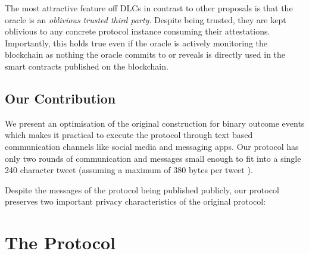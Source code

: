 \documentclass[runningheads]{llncs}
\begin{document}
The most attractive feature off DLCs in contrast to other proposals is that the oracle is an \emph{oblivious trusted third party}\cite{cryptoeprint:2011:319}. Despite being trusted, they are kept oblivious to any concrete protocol instance consuming their attestations. Importantly, this holds true even if the oracle is actively monitoring the blockchain as nothing the oracle commits to or reveals is directly used in the smart contracts published on the blockchain.

\subsection{Our Contribution}

We present an optimisation of the original construction for binary outcome events which makes it practical to execute the protocol through text based communication channels like social media and messaging apps. Our protocol has only two rounds of communication and messages small enough to fit into a single 240 character tweet (assuming a maximum of 380 bytes per tweet \cite{base2048}).

Despite the messages of the protocol being published publicly, our protocol preserves two important privacy characteristics of the original protocol:




\section{The Protocol}
\newcommand{\Rec}{\textsf{Rec}}
\newcommand{\bet}{\beta}
\newcommand{\hatsigma}{\hat{\sigma}}
\newcommand{\Fund}{\textsf{Fund}}
\newcommand{\Outcome}{\textsf{Outcome}}
\newcommand{\KeyGen}{\textsf{KeyGen}}
\newcommand{\win}{\textsf{win}}
\newcommand{\Verify}{\textsf{Vrfy}}
\newcommand{\Tx}{\textsf{Tx}}
\newcommand{\EncVer}{\textsf{EncVrfy}}
\newcommand{\Pdleq}{\pcalgostyle{P}_{\textsf{DLEQ}}}
\newcommand{\Vdleq}{\pcalgostyle{V}_{\textsf{DLEQ}}}
\newcommand{\change}{\textsf{change}}
\newcommand{\val}{\textsf{val}}
\newcommand{\OPCHECKMULTISIG}{\texttt{CHECKMULTISIG}}
\newcommand{\OPCMS}{\texttt{OP\_CMS}_{\text{1-of-2}}}
\newcommand{\fee}{\textsf{fee}}
\newcommand{\Sign}{\textsf{Sign}}
\newcommand{\EncSign}{\textsf{EncSign}}
\newcommand{\Rx}{R_\texttt{x}}
\newcommand{\DecSig}{\textsf{DecSig}}
\newcommand{\TxGen}{\textsf{TxGen}}
\newcommand{\eventid}{\textsf{event\_id}}
\newcommand{\PRG}{\textsf{PRG}}
\newcommand{\HKDF}{H_{\textsf{KDF}}}
\newcommand{\G}{\mathbb{G}}
\newcommand{\Enc}{\textsf{Enc}}
\newcommand{\Dec}{\textsf{Dec}}
\newcommand{\VrfyWitness}{\textsf{VerifyWitness}}
\newcommand{\GenFund}{\textsf{GenFund}}
\newcommand{\GenWitness}{\textsf{Witness}}
\end{document}
